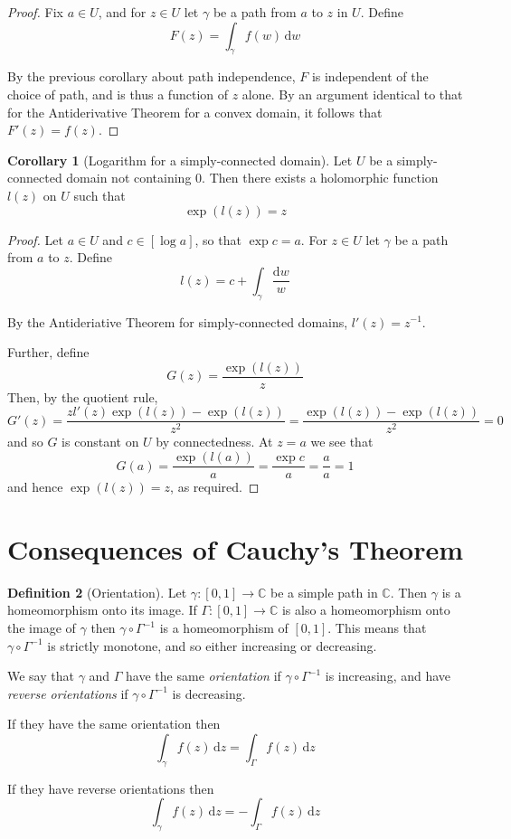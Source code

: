 \documentclass[10pt,fleqn]{article}
\newcommand{\diff}{\,\mathrm{d}}
\newcommand{\comps}{\mathbb{C}}
\theoremstyle{definition} \newtheorem{defn}{Definition}[section]
\theoremstyle{plain}      \newtheorem{thm}[defn]{Theorem}
\theoremstyle{definition} \newtheorem{prop}[defn]{Proposition}
\theoremstyle{plain}      \newtheorem{lem}[defn]{Lemma}
\theoremstyle{definition} \newtheorem{cor}[defn]{Corollary}
\theoremstyle{definition} \newtheorem{ex}[defn]{Example}
\theoremstyle{definition} \newtheorem{rem}[defn]{Remark}
\begin{document}
\begin{proof}
    Fix $a\in U$, and for $z\in U$ let $\gamma$ be a path from $a$ to $z$ in $U$.
    Define
    \[
        F(z)=
        \int_{\gamma} f(w)\diff w
    \]

    By the previous corollary about path independence, $F$ is independent of the choice of path, and is thus a function of $z$ alone.
    By an argument identical to that for the Antiderivative Theorem for a convex domain, it follows that $F'(z)=f(z)$.
\end{proof}

\begin{cor}[Logarithm for a simply-connected domain]
    Let $U$ be a simply-connected domain not containing $0$.
    Then there exists a holomorphic function $l(z)$ on $U$ such that
    \[
        \exp(l(z))=z
    \]
\end{cor}

\begin{proof}
    Let $a\in U$ and $c\in[\log a]$, so that $\exp c=a$.
    For $z\in U$ let $\gamma$ be a path from $a$ to $z$.
    Define
    \[
        l(z)=
        c+\int_{\gamma}\frac{\mathrm{d}w}{w}
    \]

    By the Antideriative Theorem for simply-connected domains, $l'(z)=z^{-1}$.
    
    Further, define
    \[
        G(z)=
        \frac{\exp(l(z))}{z}
    \]
    Then, by the quotient rule,
    \[
        G'(z)=
        \frac{zl'(z)\exp(l(z))-\exp(l(z))}{z^2}=
        \frac{\exp(l(z))-\exp(l(z))}{z^2}
        =0
    \]
    and so $G$ is constant on $U$ by connectedness.
    At $z=a$ we see that
    \[
        G(a)=
        \frac{\exp(l(a))}{a}=
        \frac{\exp c}{a}=
        \frac{a}{a}
        =1
    \]
    and hence $\exp(l(z))=z$, as required.
\end{proof}


\section{Consequences of Cauchy's Theorem}

\begin{defn}[Orientation]
    Let $\gamma:[0,1]\to\comps$ be a simple path in $\comps$.
    Then $\gamma$ is a homeomorphism onto its image.
    If $\Gamma:[0,1]\to\comps$ is also a homeomorphism onto the image of $\gamma$ then $\gamma\circ\Gamma^{-1}$ is a homeomorphism of $[0,1]$.
    This means that $\gamma\circ\Gamma^{-1}$ is strictly monotone, and so either increasing or decreasing.

    We say that $\gamma$ and $\Gamma$ have the same \emph{orientation} if $\gamma\circ\Gamma^{-1}$ is increasing, and have \emph{reverse orientations} if $\gamma\circ\Gamma^{-1}$ is decreasing.

    If they have the same orientation then
    \[
        \int_{\gamma} f(z)\diff z=
        \int_{\Gamma} f(z)\diff z
    \]

    If they have reverse orientations then
    \[
        \int_{\gamma} f(z)\diff z=
        -\int_{\Gamma} f(z)\diff z        
    \]
\end{defn}
\end{document}
